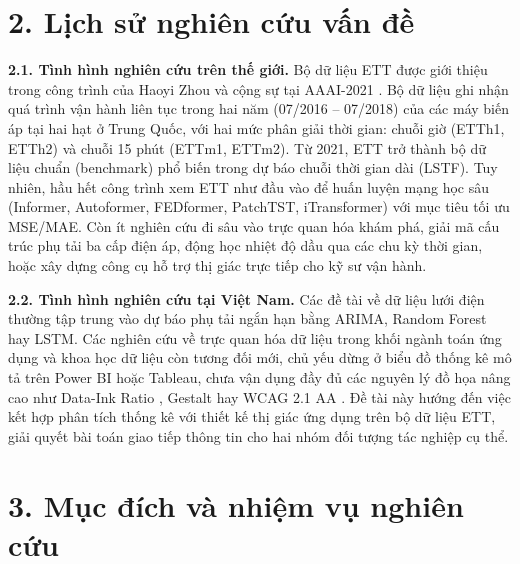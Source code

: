 \documentclass[12pt,a4paper,oneside]{report}
\begin{document}
\section*{2. Lịch sử nghiên cứu vấn đề}

\textbf{2.1. Tình hình nghiên cứu trên thế giới.} Bộ dữ liệu ETT được giới thiệu trong công trình của Haoyi Zhou và cộng sự tại AAAI-2021 \cite{zhou2021informer}. Bộ dữ liệu ghi nhận quá trình vận hành liên tục trong hai năm (07/2016 -- 07/2018) của các máy biến áp tại hai hạt ở Trung Quốc, với hai mức phân giải thời gian: chuỗi giờ (ETTh1, ETTh2) và chuỗi 15 phút (ETTm1, ETTm2). Từ 2021, ETT trở thành bộ dữ liệu chuẩn (benchmark) phổ biến trong dự báo chuỗi thời gian dài (LSTF). Tuy nhiên, hầu hết công trình xem ETT như đầu vào để huấn luyện mạng học sâu (Informer, Autoformer, FEDformer, PatchTST, iTransformer) với mục tiêu tối ưu MSE/MAE. Còn ít nghiên cứu đi sâu vào trực quan hóa khám phá, giải mã cấu trúc phụ tải ba cấp điện áp, động học nhiệt độ dầu qua các chu kỳ thời gian, hoặc xây dựng công cụ hỗ trợ thị giác trực tiếp cho kỹ sư vận hành.

\textbf{2.2. Tình hình nghiên cứu tại Việt Nam.} Các đề tài về dữ liệu lưới điện thường tập trung vào dự báo phụ tải ngắn hạn bằng ARIMA, Random Forest hay LSTM. Các nghiên cứu về trực quan hóa dữ liệu trong khối ngành toán ứng dụng và khoa học dữ liệu còn tương đối mới, chủ yếu dừng ở biểu đồ thống kê mô tả trên Power BI hoặc Tableau, chưa vận dụng đầy đủ các nguyên lý đồ họa nâng cao như Data-Ink Ratio \cite{tufte2001}, Gestalt hay WCAG 2.1 AA \cite{wcag21}. Đề tài này hướng đến việc kết hợp phân tích thống kê với thiết kế thị giác ứng dụng trên bộ dữ liệu ETT, giải quyết bài toán giao tiếp thông tin cho hai nhóm đối tượng tác nghiệp cụ thể.

\section*{3. Mục đích và nhiệm vụ nghiên cứu}
\end{document}
